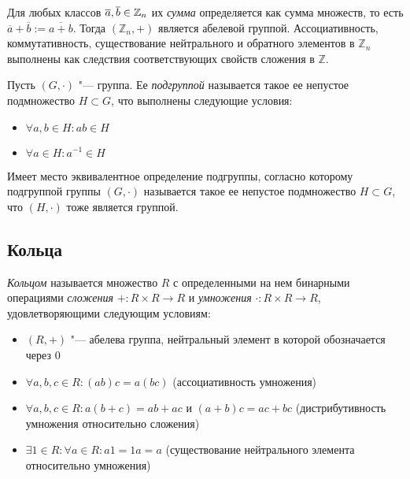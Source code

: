 \begin{example}
	Для любых классов $\overline a, \overline b \in \mathbb{Z}_n$ их \textit{сумма} определяется как сумма множеств, то есть $\overline{a} + \overline{b} := \overline{a + b}$. Тогда $(\mathbb{Z}_n, +)$ является абелевой группой. Ассоциативность, коммутативность, существование нейтрального и обратного элементов в $\mathbb{Z}_n$ выполнены как следствия соответствующих свойств сложения в $\mathbb{Z}$.
\end{example}

\begin{definition}
	Пусть $(G, \cdot)$ "--- группа. Ее \textit{подгруппой} называется такое ее непустое подмножество $H \subset G$, что выполнены следующие условия:
	\begin{itemize}
		\item $\forall a, b \in H: ab \in H$
		\item $\forall a \in H : a^{-1} \in H$
	\end{itemize}
\end{definition}

\begin{note}
	Имеет место эквивалентное определение подгруппы, согласно которому подгруппой группы $(G, \cdot)$ называется такое ее непустое подмножество $H \subset G$, что $(H, \cdot)$ тоже является группой.
\end{note}

\subsection{Кольца}

\begin{definition}
	\textit{Кольцом} называется множество $R$ с определенными на нем бинарными операциями \textit{сложения} $+ : R \times R \to R$ и \textit{умножения} $\cdot: R \times R \rightarrow R$, удовлетворяющими следующим условиям:
	\begin{itemize}
		\item $(R, +)$ "--- абелева группа, нейтральный элемент в которой обозначается через $0$
		\item $\forall a, b, c \in R: (ab)c = a(bc)$ (ассоциативность умножения)
		\item $\forall a, b, c \in R: a(b + c) = ab + ac$ и $(a + b)c = ac + bc$ (дистрибутивность умножения относительно сложения)
		\item $\exists 1 \in R: \forall a \in R: a1 = 1a = a$ (существование нейтрального элемента относительно умножения)
	\end{itemize}
\end{definition}

